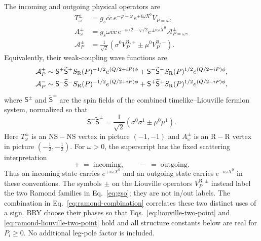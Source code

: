 \documentclass[11pt]{article}
\newcommand{\NSNS}{\mathrm{NS\!\!-\!\!NS}}
\newcommand{\RR}{\mathrm{R\!\!-\!\!R}}
\begin{document}
The incoming and outgoing physical operators are
\begin{align}
 T_\omega^\pm
 &=g_s c\widetilde c\,
 e^{-\varphi-\widetilde\varphi}
 e^{\pm i\omega X^0}V_{P=\omega},
 \label{eq:tachyon-vertex}\\
 A_\omega^\pm
 &=g_s\omega c\widetilde c\,
 e^{-\varphi/2-\widetilde\varphi/2}
 e^{\pm i\omega X^0}\mathcal A_{P=\omega}^{\pm},
 \label{eq:axion-vertex}\\
 \mathcal A_P^\pm
 &=\frac1{\sqrt2}\left(
 \sigma^0V_P^{\mathrm R,+}
 \pm\mu^0V_P^{\mathrm R,-}\right).
 \label{eq:ramond-combination}
\end{align}
Equivalently, their weak-coupling wave functions are
\begin{align}
 \mathcal A_P^+
 &\sim \mathsf S^+\widetilde{\mathsf S}^{+}S_{\rm R}(P)^{-1/2}
 e^{(Q/2+iP)\phi}
 +\mathsf S^-\widetilde{\mathsf S}^{-}S_{\rm R}(P)^{1/2}
 e^{(Q/2-iP)\phi},\notag\\
 \mathcal A_P^-
 &\sim \mathsf S^-\widetilde{\mathsf S}^{-}S_{\rm R}(P)^{-1/2}
 e^{(Q/2+iP)\phi}
 +\mathsf S^+\widetilde{\mathsf S}^{+}S_{\rm R}(P)^{1/2}
 e^{(Q/2-iP)\phi},
 \label{eq:combined-ramond-asymptotic}
\end{align}
where $\mathsf S^\pm$ and $\widetilde{\mathsf S}^{\pm}$ are the spin fields
of the combined timelike--Liouville fermion system, normalized so that
\begin{equation}
 \mathsf S^\pm\widetilde{\mathsf S}^{\pm}
 =\frac1{\sqrt2}\left(\sigma^0\sigma^1\pm\mu^0\mu^1\right).
 \label{eq:combined-spin-fields}
\end{equation}
Here $T_\omega^\pm$ is an $\NSNS$ vertex in picture $(-1,-1)$ and
$A_\omega^\pm$ is an $\RR$ vertex in picture
$(-\tfrac12,-\tfrac12)$.  For $\omega>0$, the superscript has the fixed
scattering interpretation
\begin{equation}
 +\;=\;\text{incoming},
 \qquad
 -\;=\;\text{outgoing}.
 \label{eq:in-out-sign}
\end{equation}
Thus an incoming state carries $e^{+i\omega X^0}$ and an outgoing state
carries $e^{-i\omega X^0}$ in these conventions.  The symbols $\pm$ on the
Liouville operators $V_P^{\mathrm R,\pm}$ instead label the two Ramond
families in Eq.~\eqref{eq:gso}; they are not in/out labels.  The combination
in Eq.~\eqref{eq:ramond-combination} correlates these two distinct uses of a
sign.  BRY choose their phases so that
Eqs.~\eqref{eq:liouville-two-point} and
\eqref{eq:ramond-liouville-two-point} hold and all structure constants below
are real for $P_i\geq0$.  No additional leg-pole factor is included.
\end{document}
